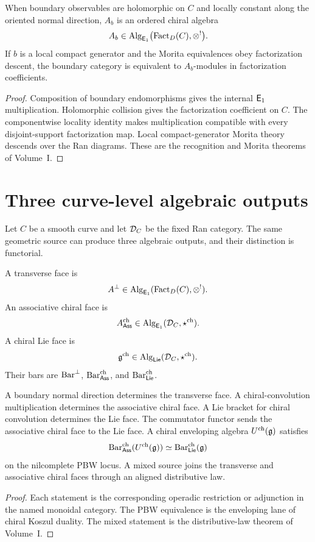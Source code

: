 \begin{theorem}
When boundary observables are holomorphic on $C$ and locally constant along the oriented normal direction, $A_b$ is an ordered chiral algebra
\[
 A_b\in\operatorname{Alg}_{\mathsf E_1}\bigl(\operatorname{Fact}_D(C),\otimes^!\bigr).
\]
If $b$ is a local compact generator and the Morita equivalences obey factorization descent, the boundary category is equivalent to $A_b$-modules in factorization coefficients.
\end{theorem}
\begin{proof}
Composition of boundary endomorphisms gives the internal $\mathsf E_1$ multiplication. Holomorphic collision gives the factorization coefficient on $C$. The componentwise locality identity makes multiplication compatible with every disjoint-support factorization map. Local compact-generator Morita theory descends over the Ran diagrams. These are the recognition and Morita theorems of Volume~I.
\end{proof}


\chapter{Three curve-level algebraic outputs}
Let $C$ be a smooth curve and let $\mathcal D_C$ be the fixed Ran category.  The same geometric source can produce three algebraic outputs, and their distinction is functorial.

\begin{definition}
A transverse face is
\[
 A^\perp\in\operatorname{Alg}_{\mathsf E_1}(\operatorname{Fact}_D(C),\otimes^!).
\]
An associative chiral face is
\[
 A^{\mathrm{ch}}_{\mathsf{Ass}}\in\operatorname{Alg}_{\mathsf E_1}(\mathcal D_C,\mathbin{\star^{\mathrm{ch}}}).
\]
A chiral Lie face is
\[
 \mathfrak g^{\mathrm{ch}}\in\operatorname{Alg}_{\mathsf{Lie}}(\mathcal D_C,\mathbin{\star^{\mathrm{ch}}}).
\]
Their bars are $\operatorname{Bar}^{\perp}$, $\operatorname{Bar}^{\mathrm{ch}}_{\mathsf{Ass}}$, and $\operatorname{Bar}^{\mathrm{ch}}_{\mathsf{Lie}}$.
\end{definition}

\begin{theorem}
A boundary normal direction determines the transverse face.  A chiral-convolution multiplication determines the associative chiral face.  A Lie bracket for chiral convolution determines the Lie face.  The commutator functor sends the associative chiral face to the Lie face.  A chiral enveloping algebra $U^{\mathrm{ch}}(\mathfrak g)$ satisfies
\[
 \operatorname{Bar}^{\mathrm{ch}}_{\mathsf{Ass}}(U^{\mathrm{ch}}(\mathfrak g))\simeq\operatorname{Bar}^{\mathrm{ch}}_{\mathsf{Lie}}(\mathfrak g)
\]
on the nilcomplete PBW locus.  A mixed source joins the transverse and associative chiral faces through an aligned distributive law.
\end{theorem}
\begin{proof}
Each statement is the corresponding operadic restriction or adjunction in the named monoidal category.  The PBW equivalence is the enveloping lane of chiral Koszul duality.  The mixed statement is the distributive-law theorem of Volume~I.
\end{proof}

